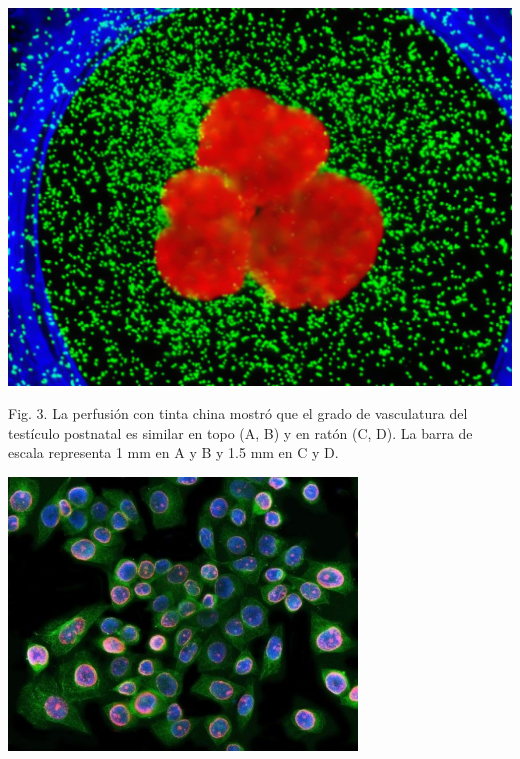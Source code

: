 \documentclass[a0,portrait]{a0poster}
\newcommand{\texto}[1]{\fontsize{30pt}{30pt}\selectfont #1}
\begin{document}
\begin{multicols*}{2}
\begin{center}
\begin{minipage}[t]{\columnwidth}
\includegraphics[width=\textwidth]{fotos/Fig3poster}

\begin{framed}
Fig. 3. La perfusión con tinta china mostró que el grado de vasculatura del testículo postnatal es similar en topo (A, B) y en ratón (C, D). La barra de escala representa 1 mm en A y B y 1.5 mm en C y D. 
\end{framed}
\end{minipage}
\end{center}

\texto{

}

\begin{center}
\begin{minipage}[t]{\columnwidth}
\includegraphics[width=\textwidth]{fotos/Fig4poster}


\end{minipage}
\end{center}
\end{multicols*}
\end{document}
